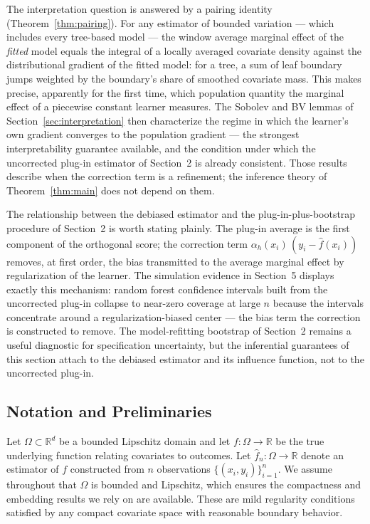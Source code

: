 \documentclass[12pt]{article}
\newcommand{\R}{\mathbb{R}}
\newcommand{\fn}{\hat{f}_n}
\begin{document}
	The interpretation question is answered by a pairing identity
	(Theorem~\ref{thm:pairing}). For any estimator of bounded variation --- which
	includes every tree-based model --- the window average marginal effect of the
	\emph{fitted} model equals the integral of a locally averaged covariate density
	against the distributional gradient of the fitted model: for a tree, a sum of leaf
	boundary jumps weighted by the boundary's share of smoothed covariate mass. This
	makes precise, apparently for the first time, which population quantity the marginal
	effect of a piecewise constant learner measures. The Sobolev and BV lemmas of
	Section~\ref{sec:interpretation} then characterize the regime in which the learner's own
	gradient converges to the population gradient --- the strongest interpretability
	guarantee available, and the condition under which the uncorrected plug-in estimator
	of Section~2 is already consistent. Those results describe when the correction term
	is a refinement; the inference theory of Theorem~\ref{thm:main} does not depend on
	them.
	
	The relationship between the debiased estimator and the plug-in-plus-bootstrap
	procedure of Section~2 is worth stating plainly. The plug-in average is the first
	component of the orthogonal score; the correction term
	$\alpha_h(x_i)\,(y_i - \hat{f}(x_i))$ removes, at first order, the bias transmitted
	to the average marginal effect by regularization of the learner. The simulation
	evidence in Section~5 displays exactly this mechanism: random forest confidence
	intervals built from the uncorrected plug-in collapse to near-zero coverage at large
	$n$ because the intervals concentrate around a regularization-biased center --- the
	bias term the correction is constructed to remove. The model-refitting bootstrap of
	Section~2 remains a useful diagnostic for specification uncertainty, but the
	inferential guarantees of this section attach to the debiased estimator and its
	influence function, not to the uncorrected plug-in.
	
	\subsection{Notation and Preliminaries}
	
	Let $\Omega \subset \R^d$ be a bounded Lipschitz domain and let $f: \Omega \to \R$
	be the true underlying function relating covariates to outcomes. Let
	$\fn: \Omega \to \R$ denote an estimator of $f$ constructed from $n$ observations
	$\{(x_i, y_i)\}_{i=1}^n$. We assume throughout that $\Omega$ is bounded and
	Lipschitz, which ensures the compactness and embedding results we rely on are
	available. These are mild regularity conditions satisfied by any compact covariate
	space with reasonable boundary behavior.
	
\end{document}
